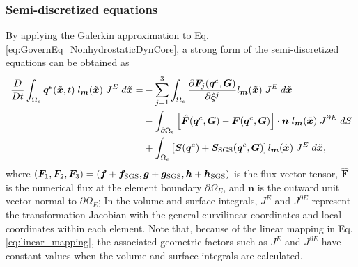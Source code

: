 \subsubsection{Semi-discretized equations}
By applying the Galerkin approximation to Eq.\,\eqref{eq:GovernEq_NonhydrostaticDynCore}, 
a strong form of the semi-discretized equations can be obtained as 
\begin{align}
  \dfrac{D}{Dt} \int_{\Omega_e} \bm{q}^e (\tilde{\bm{x}},t) \; l_{\bm{m}} (\tilde{\bm{x}}) \; J^E \; d\tilde{\bm{x}}
  = 
   &- \sum_{j=1}^3  
    \int_{\Omega_e} \dfrac{\partial \bm{F}_j (\bm{q}^e,\bm{G})}{\partial \xi^j}  l_{\bm{m}} (\tilde{\bm{x}}) \; J^E \; d\tilde{\bm{x}} \nonumber \\
   &- 
    \int_{\partial \Omega_{e}} \left[ \hat{\bm{F}} (\bm{q}^e,\bm{G}) - \bm{F}  (\bm{q}^e,\bm{G}) \right] \cdot \bm{n} \; l_{\bm{m}} (\tilde{\bm{x}}) \; J^{\partial E} \; dS  \nonumber \\
   &+ \int_{\Omega_{e}} \left[ \bm{S} (\bm{q}^e) + \bm{S}_{\rm SGS} (\bm{q}^e,\bm{G}) \right] l_{\bm{m}} (\tilde{\bm{x}}) \; J^E \; d\tilde{\bm{x}}, 
\label{eq:semidiscrete_eqs}
\end{align}
where 
$(\bm{F}_1,\bm{F}_2,\bm{F}_3)=(\bm{f}+\bm{f}_{\rm SGS},\bm{g}+\bm{g}_{\rm SGS},\bm{h}+\bm{h}_{\rm SGS})$ is the flux vector tensor, 
$\hat{\bm{F}}$ is the numerical flux at the element boundary $\partial\Omega_E$, 
and 
$\bm{n}$ is the outward unit vector normal to $\partial\Omega_E$; 
In the volume and surface integrals, 
$J^E$ and $J^{\partial E}$ represent the transformation Jacobian with the general curvilinear coordinates 
and local coordinates within each element. 
Note that, because of the linear mapping in Eq.\,\eqref{eq:linear_mapping}, 
the associated geometric factors such as $J^E$ and $J^{\partial E}$ have constant values  
when the volume and surface integrals are calculated. 

